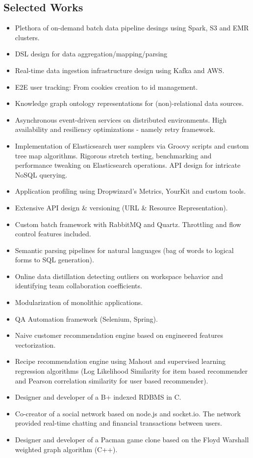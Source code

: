 \documentclass{article}
\begin{document}
	\vspace{+0.5cm}
	\begin{multicols}{2}
	
		\section*{\color{NavyBlue}Selected Works}
		\vspace{-0.5cm}
		{\color{NavyBlue}\hrulefill}
			\begin{itemize}
				\item Plethora of on-demand batch data pipeline desings using Spark, S3 and EMR clusters.
				\item DSL design for data aggregation/mapping/parsing
				\item Real-time data ingestion infrastructure design using Kafka and AWS.
				\item E2E user tracking: From cookies creation to id management.
				\item Knowledge graph ontology representations for (non)-relational data sources.
				\item Asynchronous event-driven services on distributed environments. High availability and resiliency optimizations - namely retry framework.
				\item Implementation of Elasticsearch user samplers via Groovy scripts and custom tree map algorithms. Rigorous stretch testing, benchmarking and performance tweaking on Elasticsearch operations. API design for intricate NoSQL querying.
				\item Application profiling using Dropwizard’s Metrics, YourKit and custom tools.
				\item Extensive API design \& versioning (URL \& Resource Representation).
				\item Custom batch framework with RabbitMQ and Quartz. Throttling and flow control features included.
				\item Semantic parsing pipelines for natural languages (bag of words to logical forms to SQL generation).
				\item Online data distillation detecting outliers on workspace behavior and identifying team collaboration coefficients.
				\item Modularization of monolithic applications.
				\item QA Automation framework (Selenium, Spring).
				\item Naive customer recommendation engine based on engineered features vectorization.
				\item Recipe recommendation engine using Mahout and supervised learning regression algorithms (Log Likelihood Similarity for item based recommender and Pearson correlation similarity for user based recommender).
				\item Designer and developer of a B+ indexed RDBMS in C.
				\item Co-creator of a social network based on node.js and socket.io. The network provided real-time chatting and financial transactions between users.
				\item Designer and developer of a Pacman game clone based on the Floyd Warshall weighted graph algorithm (C++).
				

\end{itemize}
\end{multicols}
\end{document}
